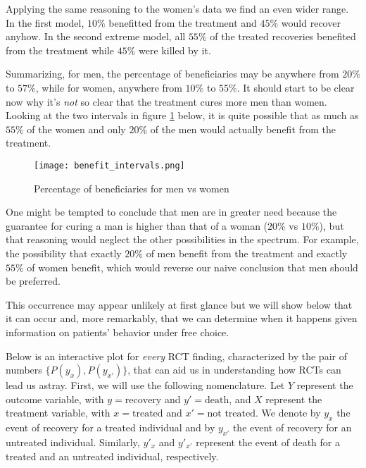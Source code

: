 \documentclass{article}
\begin{document}
Applying the same reasoning to the women's data we find an even wider range. In the first model, $10\%$ benefitted from the treatment and $45\%$ would recover anyhow. In the second extreme model, all $55\%$ of the treated recoveries benefited from the treatment while $45\%$ were killed by it.

Summarizing, for men, the percentage of beneficiaries may be anywhere from $20\%$ to $57\%$, while for women, anywhere from $10\%$ to $55\%$. It should start to be clear now why it's \emph{not} so clear that the treatment cures more men than women. Looking at the two intervals in figure \ref{fig:intervals} below, it is quite possible that as much as $55\%$ of the women and only $20\%$ of the men would actually benefit from the treatment.

\begin{figure}[ht]
    \centering
    \texttt{[image: benefit\_intervals.png]}
    \caption{Percentage of beneficiaries for men vs women}
    \label{fig:intervals}
\end{figure}
    
One might be tempted to conclude that men are in greater need because the guarantee for curing a man is higher than that of a woman ($20\%$ vs $10\%$), but that reasoning would neglect the other possibilities in the spectrum. For example, the possibility that exactly $20\%$ of men benefit from the treatment and exactly $55\%$ of women benefit, which would reverse our naive conclusion that men should be preferred.

This occurrence may appear unlikely at first glance but we will show below that it can occur and, more remarkably, that we can determine when it happens given information on patients' behavior under free choice.

Below is an interactive plot for \emph{every} RCT finding, characterized by the pair of numbers $\{P(y_x), P(y_{x'})\}$, that can aid us in understanding how RCTs can lead us astray. First, we will use the following nomenclature. Let $Y$ represent the outcome variable, with $y = \text{recovery}$ and $y' = \text{death}$, and $X$ represent the treatment variable, with $x = \text{treated}$ and $x' = \text{not treated}$. We denote by $y_x$ the event of recovery for a treated individual and by $y_{x'}$ the event of recovery for an untreated individual. Similarly, $y'_x$ and $y'_{x'}$ represent the event of death for a treated and an untreated individual, respectively.
\end{document}
